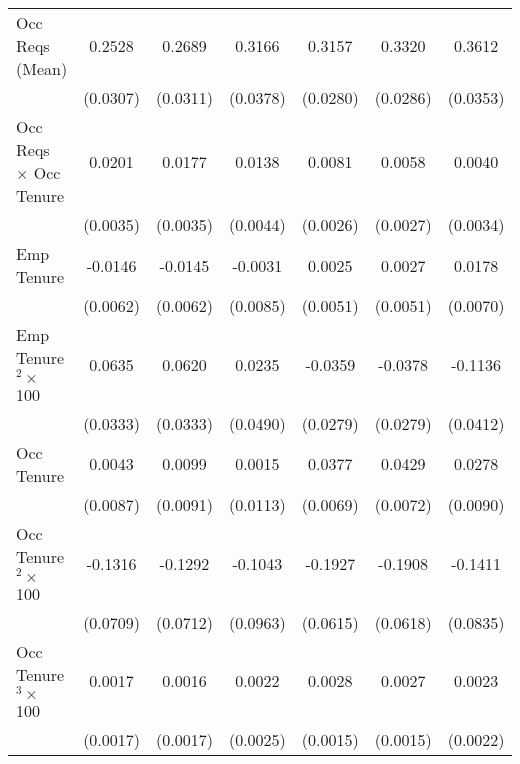 {\begin{longtable}{l*{6}{c}}
Occ Reqs (Mean)     &      0.2528\sym{***}&      0.2689\sym{***}&      0.3166\sym{***}&      0.3157\sym{***}&      0.3320\sym{***}&      0.3612\sym{***}\\
                    &    (0.0307)         &    (0.0311)         &    (0.0378)         &    (0.0280)         &    (0.0286)         &    (0.0353)         \\
Occ Reqs $\times$ Occ Tenure&      0.0201\sym{***}&      0.0177\sym{***}&      0.0138\sym{***}&      0.0081\sym{***}&      0.0058\sym{**} &      0.0040         \\
                    &    (0.0035)         &    (0.0035)         &    (0.0044)         &    (0.0026)         &    (0.0027)         &    (0.0034)         \\
Emp Tenure          &     -0.0146\sym{**} &     -0.0145\sym{**} &     -0.0031         &      0.0025         &      0.0027         &      0.0178\sym{**} \\
                    &    (0.0062)         &    (0.0062)         &    (0.0085)         &    (0.0051)         &    (0.0051)         &    (0.0070)         \\
Emp Tenure$^2\times$ 100&      0.0635\sym{*}  &      0.0620\sym{*}  &      0.0235         &     -0.0359         &     -0.0378         &     -0.1136\sym{***}\\
                    &    (0.0333)         &    (0.0333)         &    (0.0490)         &    (0.0279)         &    (0.0279)         &    (0.0412)         \\
Occ Tenure          &      0.0043         &      0.0099         &      0.0015         &      0.0377\sym{***}&      0.0429\sym{***}&      0.0278\sym{***}\\
                    &    (0.0087)         &    (0.0091)         &    (0.0113)         &    (0.0069)         &    (0.0072)         &    (0.0090)         \\
Occ Tenure$^2\times$ 100&     -0.1316\sym{*}  &     -0.1292\sym{*}  &     -0.1043         &     -0.1927\sym{***}&     -0.1908\sym{***}&     -0.1411\sym{*}  \\
                    &    (0.0709)         &    (0.0712)         &    (0.0963)         &    (0.0615)         &    (0.0618)         &    (0.0835)         \\
Occ Tenure$^3\times$ 100&      0.0017         &      0.0016         &      0.0022         &      0.0028\sym{*}  &      0.0027\sym{*}  &      0.0023         \\
                    &    (0.0017)         &    (0.0017)         &    (0.0025)         &    (0.0015)         &    (0.0015)         &    (0.0022)         \\

\end{longtable}}
